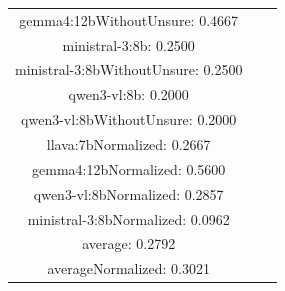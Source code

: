 \documentclass[a4paper]{article}
\begin{document}
\begin{tabular}{ccc}
gemma4:12bWithoutUnsure: 0.4667 \\ ministral-3:8b: 0.2500 \\ ministral-3:8bWithoutUnsure: 0.2500 \\ qwen3-vl:8b: 0.2000 \\ qwen3-vl:8bWithoutUnsure: 0.2000 \\ llava:7bNormalized: 0.2667 \\ gemma4:12bNormalized: 0.5600 \\ qwen3-vl:8bNormalized: 0.2857 \\ ministral-3:8bNormalized: 0.0962 \\ average: 0.2792 \\ averageNormalized: 0.3021 \end{minipage}\\
\end{tabular}

\vspace{5mm}
\end{document}
